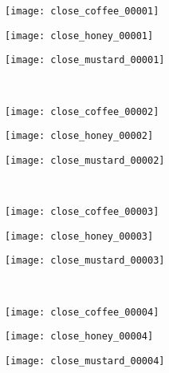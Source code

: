 \documentclass{bmvc2k}
\begin{document}
\begin{figure}[h]
	\centering      
	\begin{subfigure}[b]{0.32\textwidth}
		\texttt{[image: close\_coffee\_00001]}
	\end{subfigure}
	\begin{subfigure}[b]{0.32\textwidth}
		\texttt{[image: close\_honey\_00001]}
	\end{subfigure}
	\begin{subfigure}[b]{0.32\textwidth}
		\texttt{[image: close\_mustard\_00001]}
	\end{subfigure}\\
	\vskip 2mm
	\begin{subfigure}[b]{0.32\textwidth}
		\texttt{[image: close\_coffee\_00002]}
	\end{subfigure}
	\begin{subfigure}[b]{0.32\textwidth}
		\texttt{[image: close\_honey\_00002]}
	\end{subfigure}
	\begin{subfigure}[b]{0.32\textwidth}
		\texttt{[image: close\_mustard\_00002]}
	\end{subfigure}\\
	\vskip 2mm
	\begin{subfigure}[b]{0.32\textwidth}
		\texttt{[image: close\_coffee\_00003]}
	\end{subfigure}
	\begin{subfigure}[b]{0.32\textwidth}
		\texttt{[image: close\_honey\_00003]}
	\end{subfigure}
	\begin{subfigure}[b]{0.32\textwidth}
		\texttt{[image: close\_mustard\_00003]}
	\end{subfigure}\\
	\vskip 2mm
	\begin{subfigure}[b]{0.32\textwidth}
		\texttt{[image: close\_coffee\_00004]}
	\end{subfigure}
	\begin{subfigure}[b]{0.32\textwidth}
		\texttt{[image: close\_honey\_00004]}
	\end{subfigure}
	\begin{subfigure}[b]{0.32\textwidth}
		\texttt{[image: close\_mustard\_00004]}
	\end{subfigure}\\
	\vskip 2mm
	\begin{subfigure}[b]{0.32\textwidth}

\end{subfigure}
\end{figure}
\end{document}
